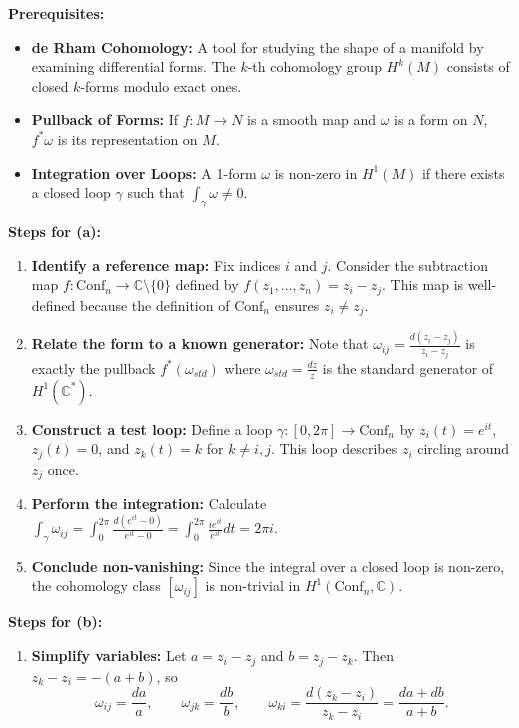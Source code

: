 \begin{solution}
\textbf{Prerequisites:}
\begin{itemize}
    \item \textbf{de Rham Cohomology:} A tool for studying the shape of a manifold by examining differential forms. The $k$-th cohomology group $H^k(M)$ consists of closed $k$-forms modulo exact ones.
    \item \textbf{Pullback of Forms:} If $f: M \to N$ is a smooth map and $\omega$ is a form on $N$, $f^*\omega$ is its representation on $M$.
    \item \textbf{Integration over Loops:} A 1-form $\omega$ is non-zero in $H^1(M)$ if there exists a closed loop $\gamma$ such that $\int_\gamma \omega \neq 0$.
\end{itemize}

\medskip
\textbf{Steps for (a):}
\begin{enumerate}
    \item \textbf{Identify a reference map:} Fix indices $i$ and $j$. Consider the subtraction map $f: \mathrm{Conf}_n \to \mathbb{C} \setminus \{0\}$ defined by $f(z_1, \dots, z_n) = z_i - z_j$. This map is well-defined because the definition of $\mathrm{Conf}_n$ ensures $z_i \neq z_j$.
    
    \item \textbf{Relate the form to a known generator:} Note that $\omega_{ij} = \frac{d(z_i - z_j)}{z_i - z_j}$ is exactly the pullback $f^*(\omega_{std})$ where $\omega_{std} = \frac{dz}{z}$ is the standard generator of $H^1(\mathbb{C}^*)$.
    
    \item \textbf{Construct a test loop:} Define a loop $\gamma: [0, 2\pi] \to \mathrm{Conf}_n$ by $z_i(t) = e^{it}$, $z_j(t) = 0$, and $z_k(t) = k$ for $k \neq i, j$. This loop describes $z_i$ circling around $z_j$ once.
    
    \item \textbf{Perform the integration:} Calculate $\int_\gamma \omega_{ij} = \int_0^{2\pi} \frac{d(e^{it} - 0)}{e^{it} - 0} = \int_0^{2\pi} \frac{ie^{it}}{e^{it}} dt = 2\pi i$.
    
    \item \textbf{Conclude non-vanishing:} Since the integral over a closed loop is non-zero, the cohomology class $[\omega_{ij}]$ is non-trivial in $H^1(\mathrm{Conf}_n, \mathbb{C})$.
\end{enumerate}

\medskip
\textbf{Steps for (b):}
\begin{enumerate}
    \item \textbf{Simplify variables:} Let $a = z_i - z_j$ and $b = z_j - z_k$. Then $z_k-z_i=-(a+b)$, so
    \[
        \omega_{ij}=\frac{da}{a},\qquad
        \omega_{jk}=\frac{db}{b},\qquad
        \omega_{ki}=\frac{d(z_k-z_i)}{z_k-z_i}
        =
        \frac{da+db}{a+b}.
    \]
    

\end{enumerate}
\end{solution}
